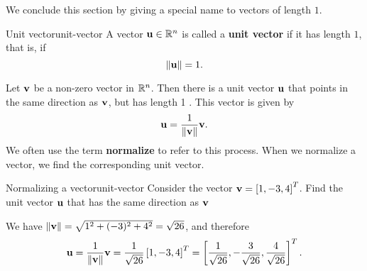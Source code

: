 We conclude this section by giving a special name to vectors of length
$1$.

\begin{definition}{Unit vector}{unit-vector}
  A vector\/ $\vect{u}\in\R^n$ is called a \textbf{unit vector}%
   if it has length $1$, that is, if
  \begin{equation*}
    \norm{\vect{u}} = 1.
  \end{equation*}
\end{definition}

Let $\vect{v}$ be a non-zero vector in $\mathbb{R}^n$. Then there is a unit
vector $\vect{u}$ that points in the same direction as $\vect{v}$, but
has length 1%
. This vector is given by
\begin{equation*}
  \vect{u} = \frac{1}{\norm{\vect{v}}} \vect{v}.
\end{equation*}
We often use the term \textbf{normalize}%
 to refer to this process. When we
normalize a vector, we find the corresponding unit vector.

\begin{example}{Normalizing a vector}{unit-vector}
  Consider the vector $\vect{v} = \mat{1, -3, 4}^T$. Find the unit
  vector $\vect{u}$ that has the same direction as $\vect{v}$
\end{example}

\begin{solution}
  We have $\norm{\vect{v}} = \sqrt{1^2 + (-3)^2 + 4^2} =
  \sqrt{26}$, and therefore
  \begin{equation*}
    \vect{u}
    = \frac{1}{\norm{\vect{v}}} \vect{v}
    = \frac{1}{\sqrt{26}} \mat{1, -3, 4}^T
    = \mat{\frac{1}{\sqrt{26}}, -\frac{3}{\sqrt{26}}, \frac{4}{\sqrt{26}}}^T.
  \end{equation*}
\end{solution}

